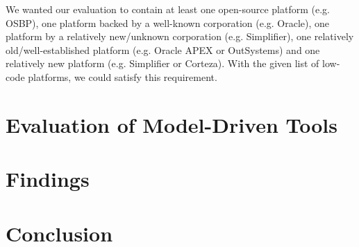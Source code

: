 \documentclass[runningheads]{llncs}
\begin{document}
We wanted our evaluation to contain at least one open-source platform (e.g. OSBP), one platform backed by a well-known corporation (e.g. Oracle), one platform by a relatively new/unknown corporation (e.g. Simplifier), one relatively old/well-established platform (e.g. Oracle APEX or OutSystems) and one relatively new platform (e.g. Simplifier or Corteza). With the given list of low-code platforms, we could satisfy this requirement.

\section{Evaluation of Model-Driven Tools}
\label{sec:evaluation_of_model_driven_tools}

\section{Findings}
\label{sec:findings}

\section{Conclusion}
\label{sec:conclusion}

\newpage
\printbibliography
\end{document}
